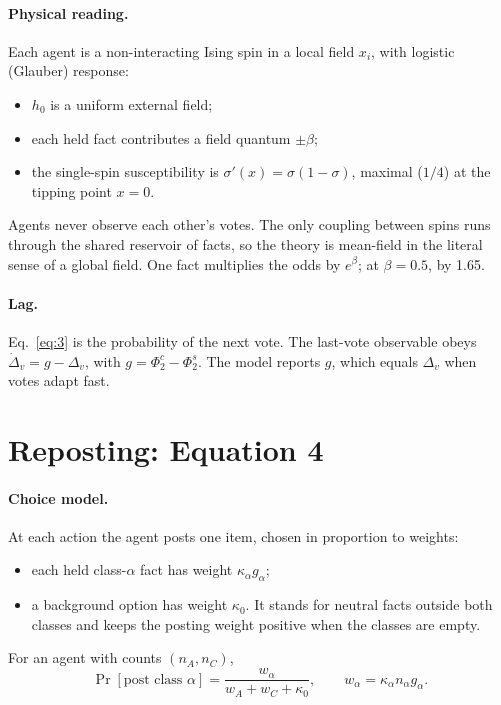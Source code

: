 \documentclass[10pt,a4paper]{article}
\theoremstyle{definition}
\begin{document}
\paragraph{Physical reading.} Each agent is a non-interacting Ising spin in a local field $x_i$, with logistic (Glauber)
response:
\begin{itemize}
\item $h_0$ is a uniform external field;
\item each held fact contributes a field quantum $\pm\beta$;
\item the single-spin susceptibility is $\sigma'(x)=\sigma(1-\sigma)$, maximal ($1/4$) at the tipping point $x=0$.
\end{itemize}
Agents never observe each other's votes. The only coupling between spins runs through the shared reservoir of facts,
so the theory is mean-field in the literal sense of a global field. One fact multiplies the odds by $e^\beta$; at
$\beta=0.5$, by 1.65.

\paragraph{Lag.} Eq.~\eqref{eq:3} is the probability of the next vote. The last-vote observable obeys
$\dot\Delta_v=g-\Delta_v$, with $g=\Phi_2^{c}-\Phi_2^{s}$. The model reports $g$, which equals $\Delta_v$ when votes
adapt fast.

\section{Reposting: Equation 4}
\label{sec:repost}
\paragraph{Choice model.} At each action the agent posts one item, chosen in proportion to weights:
\begin{itemize}
\item each held class-$\alpha$ fact has weight $\kappa_\alpha g_\alpha$;
\item a background option has weight $\kappa_0$. It stands for neutral facts outside both classes and keeps the
  posting weight positive when the classes are empty.
\end{itemize}
For an agent with counts $(n_A,n_C)$,
\begin{equation}
\Pr[\text{post class }\alpha]=\frac{w_\alpha}{w_A+w_C+\kappa_0},\qquad w_\alpha=\kappa_\alpha n_\alpha g_\alpha .
\end{equation}
\end{document}
